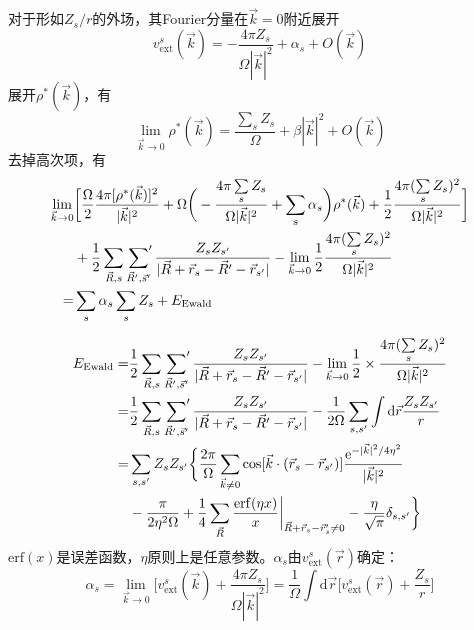 对于形如$Z_s/r$的外场，其\textrm{Fourier}分量在$\vec k=0$附近展开
	\begin{equation}
		v_{\mathrm{ext}}^s(\vec k)=-\dfrac{4\pi Z_s}{\Omega|\vec k|^2}+\alpha_s+O(\vec k)
	\end{equation}
	展开$\rho^{\ast}(\vec k)$，有
	\begin{equation}
		\lim_{\vec k\rightarrow 0}\rho^{\ast}(\vec k)=\dfrac{\sum_sZ_s}{\Omega}+\beta|\vec k|^2+O(\vec k)
	\end{equation}
去掉高次项，有
\begin{equation}
	\begin{aligned}
		\lim_{\vec k\rightarrow 0}&\bigg[\dfrac{\Omega}2\dfrac{4\pi[\rho^{\ast}(\vec k)]^2}{|\vec k|^2}+\Omega\bigg(-\dfrac{4\pi\sum\limits_sZ_s}{\Omega|\vec k|^2}+\sum\limits_s\alpha_s\bigg)\rho^{\ast}(\vec k)+\dfrac12\dfrac{4\pi(\sum\limits_sZ_s)^2}{\Omega|\vec k|^2}\bigg]\\
		&+\dfrac12\sum_{\vec R,s}\sideset{}{^{\prime}}\sum_{\vec R^{\prime},\vec s^{\prime}}\dfrac{Z_sZ_{s^{\prime}}}{|\vec R+\vec r_s-\vec R^{\prime}-\vec r_{s^{\prime}}|}-\lim_{\vec k\rightarrow0}\dfrac12\dfrac{4\pi(\sum\limits_sZ_s)^2}{\Omega|\vec k|^2}\\
		=&\sum_s\alpha_s\sum_sZ_s+E_{\mathrm{Ewald}}
	\end{aligned}
\end{equation}

	\begin{equation}
		\begin{aligned}
			E_{\textrm{Ewald}}=&\dfrac12\sum_{\vec R,s}\sideset{}{^{\prime}}\sum_{\vec R^{\prime},\vec s^{\prime}}\dfrac{Z_sZ_{s^{\prime}}}{|\vec R+\vec r_s-\vec R^{\prime}-\vec r_{s^{\prime}}|}-\lim_{\vec k\rightarrow0}\dfrac12\times\dfrac{4\pi(\sum\limits_sZ_s)^2}{\Omega|\vec k|^2}\\
			=&\dfrac12\sum_{\vec R,s}\sideset{}{^{\prime}}\sum_{\vec R^{\prime},\vec s^{\prime}}\dfrac{Z_sZ_{s^{\prime}}}{|\vec R+\vec r_s-\vec R^{\prime}-\vec r_{s^{\prime}}|}-\dfrac1{2\Omega}\sum_{s,s^{\prime}}\int\mathrm{d}\vec r\dfrac{Z_sZ_{s^{\prime}}}r\\
			=&\sum_{s,s^{\prime}}Z_sZ_{s^{\prime}}\bigg\{\dfrac{2\pi}{\Omega}\sum_{\vec k\neq 0}\cos[\vec k\cdot(\vec r_s-\vec r_{s^{\prime}})]\dfrac{\mathrm{e}^{-|\vec k|^2/4\eta^2}}{|\vec k|^2}\\
			&-\dfrac{\pi}{2\eta^2\Omega}+\dfrac14\sum_{\vec R}\dfrac{\mathrm{erf}(\eta x)}x\bigg|_{\vec R+\vec r_s-\vec r_s^{\prime}\neq0}-\dfrac{\eta}{\sqrt{\pi}}\delta_{s,s^{\prime}}\bigg\}
		\end{aligned}
	\end{equation}
	$\mathrm{erf}(x)$是误差函数，$\eta$原则上是任意参数。$\alpha_s$由$v_{\mathrm{ext}}^s(\vec r)$确定：
	\begin{equation}
		\alpha_s=\lim_{\vec k\rightarrow0}\bigg[v_{\mathrm{ext}}^s(\vec k)+\dfrac{4\pi Z_s}{\Omega|\vec k|^2}\bigg]=\dfrac1{\Omega}\int\mathrm{d}\vec r\bigg[v_{\mathrm{ext}}^s(\vec r)+\dfrac{Z_s}r\bigg]
	\end{equation}

